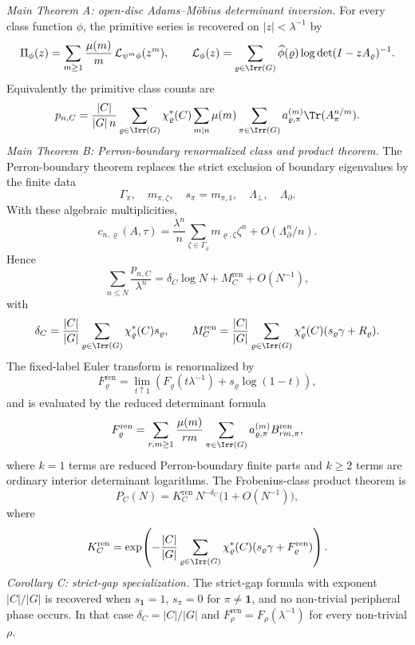 \begin{theoremsummary}
  \emph{Main Theorem A: open-disc Adams--M\"obius determinant inversion.}
  For every class function \(\phi\), the primitive series is recovered on
  \(|z|<\lambda^{-1}\) by
  \[
    \Pi_\phi(z)=
    \sum_{m\ge1}\frac{\mu(m)}{m}\,
      \mathcal L_{\psi^m\phi}(z^m),
    \qquad
    \mathcal L_\phi(z)=
    \sum_{\varrho\in\Irr(G)}\widehat\phi(\varrho)
      \log\det(I-zA_\varrho)^{-1}.
  \]
  Equivalently the primitive class counts are
  \[
    p_{n,C}=
    \frac{|C|}{|G|\,n}
    \sum_{\varrho\in\Irr(G)}\chi_\varrho^\ast(C)
    \sum_{m\mid n}\mu(m)
      \sum_{\pi\in\Irr(G)}a_{\varrho,\pi}^{(m)}
        \Tr(A_\pi^{n/m}).
  \]
  \emph{Main Theorem B: Perron-boundary renormalized class and product
  theorem.}
  The Perron-boundary theorem replaces the strict exclusion of boundary
  eigenvalues by the finite data
  \[
    \Gamma_\pi,\quad m_{\pi,\zeta},\quad s_\pi=m_{\pi,1},\quad
    \Lambda_\perp,\quad \Lambda_\partial .
  \]
  With these algebraic multiplicities,
  \[
    c_{n,\varrho}(A,\tau)
    =
    \frac{\lambda^n}{n}
      \sum_{\zeta\in\Gamma_\varrho}
        m_{\varrho,\zeta}\zeta^n
    +O(\Lambda_\partial^n/n).
  \]
  Hence
  \[
    \sum_{n\le N}\frac{p_{n,C}}{\lambda^n}
    =
    \delta_C\log N+M_C^{\mathrm{ren}}+O(N^{-1}),
  \]
  with
  \[
    \delta_C=
    \frac{|C|}{|G|}
      \sum_{\varrho\in\Irr(G)}\chi_\varrho^\ast(C)s_\varrho,
    \qquad
    M_C^{\mathrm{ren}}=
    \frac{|C|}{|G|}
      \sum_{\varrho\in\Irr(G)}
        \chi_\varrho^\ast(C)(s_\varrho\gamma+R_\varrho).
  \]
  The fixed-label Euler transform is renormalized by
  \[
    F_\varrho^{\mathrm{ren}}
    =
    \lim_{t\uparrow1}
      \left(F_\varrho(t\lambda^{-1})+s_\varrho\log(1-t)\right),
  \]
  and is evaluated by the reduced determinant formula
  \[
    F_\varrho^{\mathrm{ren}}
    =
    \sum_{r,m\ge1}\frac{\mu(m)}{rm}
      \sum_{\pi\in\Irr(G)}
        a_{\varrho,\pi}^{(m)}
        B_{rm,\pi}^{\mathrm{ren}},
  \]
  where \(k=1\) terms are reduced Perron-boundary finite parts and
  \(k\ge2\) terms are ordinary interior determinant logarithms.  The
  Frobenius-class product theorem is
  \[
    P_C(N)=K_C^{\mathrm{ren}}\,N^{-\delta_C}\bigl(1+O(N^{-1})\bigr),
  \]
  where
  \[
    K_C^{\mathrm{ren}}
    =
    \exp\!\left(
      -\frac{|C|}{|G|}
        \sum_{\varrho\in\Irr(G)}
          \chi_\varrho^\ast(C)
          (s_\varrho\gamma+F_\varrho^{\mathrm{ren}})
    \right).
  \]
  \emph{Corollary C: strict-gap specialization.}
  The strict-gap formula with exponent \(|C|/|G|\) is recovered when
  \(s_{\mathbf1}=1\), \(s_\pi=0\) for \(\pi\ne\mathbf1\), and no non-trivial
  peripheral phase occurs.  In that case
  \(\delta_C=|C|/|G|\) and
  \(F_\rho^{\mathrm{ren}}=F_\rho(\lambda^{-1})\) for every non-trivial
  \(\rho\).


\end{theoremsummary}
